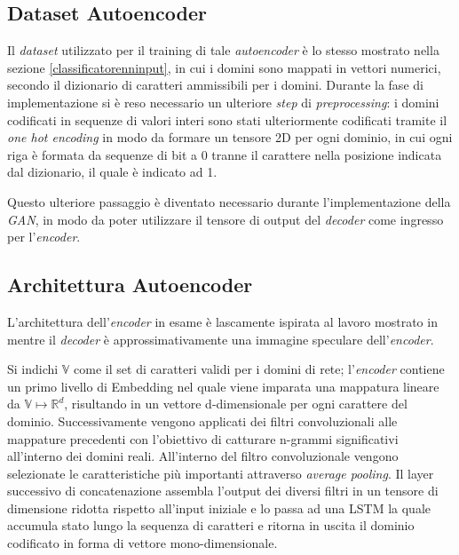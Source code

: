 \subsection{Dataset Autoencoder}
\label{datasetautoencoder}
Il \textit{dataset} utilizzato per il training di tale \textit{autoencoder} è lo stesso mostrato nella sezione \ref{classificatorenninput}, in cui i domini sono mappati in vettori numerici, secondo il dizionario di caratteri ammissibili per i domini. Durante la fase di implementazione si è reso necessario un ulteriore \textit{step} di \textit{preprocessing}: i domini codificati in sequenze di valori interi sono stati ulteriormente codificati tramite il \textit{one hot encoding} \cite{onehot} in modo da formare un tensore 2D per ogni dominio, in cui ogni riga è formata da sequenze di bit a 0 tranne il carattere nella posizione indicata dal dizionario, il quale è indicato ad 1.


Questo ulteriore passaggio è diventato necessario durante l'implementazione della \textit{GAN}, in modo da poter utilizzare il tensore di output del \textit{decoder} come ingresso per l'\textit{encoder}.


\subsection{Architettura Autoencoder}
\label{archautoencoder}
L'architettura dell'\textit{encoder} in esame è lascamente ispirata al lavoro mostrato in \cite{1508.06615} mentre il \textit{decoder} è approssimativamente una immagine speculare dell'\textit{encoder}.

Si indichi $\mathbb{V}$ come il set di caratteri validi per i domini di rete; l'\textit{encoder } contiene un primo livello di Embedding nel quale viene  imparata una mappatura lineare da $\mathbb{V} \mapsto \mathbb{R}^d$, risultando in un vettore d-dimensionale per ogni carattere del dominio. Successivamente vengono applicati dei filtri convoluzionali alle mappature precedenti con l'obiettivo di catturare n-grammi significativi all'interno dei domini reali. All'interno del filtro convoluzionale vengono selezionate le caratteristiche più importanti attraverso \textit{average pooling}. Il layer successivo di concatenazione assembla l'output dei diversi filtri in un tensore di dimensione ridotta rispetto all'input iniziale e lo passa ad una LSTM la quale accumula stato lungo la sequenza di caratteri e ritorna in uscita il dominio codificato in forma di vettore mono-dimensionale.

